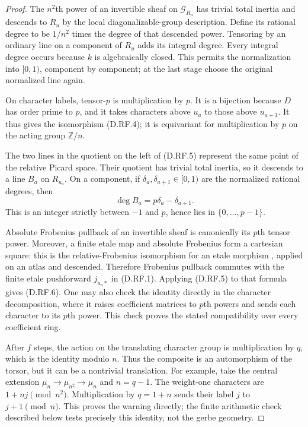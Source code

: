 \begin{proof}
The $n^2$th power of an invertible sheaf on $\mathcal G_{R_u}$
has trivial total inertia and descends to $R_u$ by the local
diagonalizable-group description. Define its rational degree to be
$1/n^2$ times the degree of that descended power. Tensoring by an
ordinary line on a component of $R_u$ adds its integral degree.
Every integral degree occurs because $k$ is algebraically closed.
This permits the normalization into $[0,1)$, component by component;
at the last stage choose the original normalized line again.

On character labels, tensor-$p$ is multiplication by $p$.
It is a bijection because $D$ has order prime to $p$, and it takes
characters above $u_a$ to those above $u_{a+1}$. It thus gives the
isomorphism (D.RF.4); it is equivariant for multiplication by $p$
on the acting group $\mathbb Z/n$.

The two lines in the quotient on the left of (D.RF.5) represent
the same point of the relative Picard space. Their quotient has
trivial total inertia, so it descends to a line $B_a$ on $R_{u_a}$.
On a component, if $\delta_a,\delta_{a+1}\in[0,1)$ are the
normalized rational degrees, then
\[
                   \deg B_a=p\delta_a-\delta_{a+1}.
\]
This is an integer strictly between $-1$ and $p$, hence lies in
$\{0,\ldots,p-1\}$.

Absolute Frobenius pullback of an invertible sheaf is canonically
its $p$th tensor power. Moreover, a finite etale map and absolute
Frobenius form a cartesian square: this is the relative-Frobenius
isomorphism for an etale morphism
\citep[Lemma~41.14.3 and complete proof, Tag 0EBS]
{StacksResidualFrobeniusD}, applied on an atlas and descended.
Therefore Frobenius pullback
commutes with the finite etale pushforward $j_{u_a*}$ in
(D.RF.1). Applying (D.RF.5) to that formula gives (D.RF.6).
One may also check the identity directly in the character
decomposition, where it raises coefficient matrices to $p$th
powers and sends each character to its $p$th power. This check
proves the stated compatibility over every coefficient ring.

After $f$ steps, the action on the translating character group is
multiplication by $q$, which is the identity modulo $n$. Thus the
composite is an automorphism of the torsor, but it can be a
nontrivial translation. For example, take the central extension
$\mu_n\to\mu_{n^2}\to\mu_n$ and $n=q-1$. The weight-one
characters are $1+nj\pmod{n^2}$. Multiplication by $q=1+n$ sends
their label $j$ to $j+1\pmod n$. This proves the warning directly;
the finite arithmetic check described below tests precisely this
identity, not the gerbe geometry.
\end{proof}

